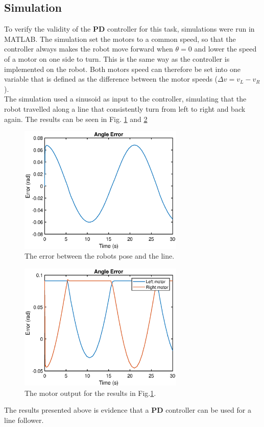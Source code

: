 \subsection{Simulation}

To verify the validity of the \textbf{PD} controller for this task, simulations were run in MATLAB. The simulation set the motors to a common speed, so that the controller always makes the robot move forward when $\theta=0$ and lower the speed of a motor on one side to turn. This is the same way as the controller is implemented on the robot. Both motors speed can therefore be set into one variable that is defined as the difference between the motor speeds ($\Delta v = v_L-v_R$). \\
\indent The simulation used a sinusoid as input to the controller, simulating that the robot travelled along a line that consistently turn from left to right and back again. The results can be seen in Fig. \ref{fig:sim_t_error} and \ref{fig:sim_LR_motor}

\begin{figure}[H]
    \centering
    \includegraphics[width=0.7\textwidth]{img/theta_error.eps}
    \caption{The error between the robots pose and the line.}
    \label{fig:sim_t_error}
\end{figure}

\begin{figure}[H]
    \centering
    \includegraphics[width=0.7\textwidth]{img/LR_motors.eps}
    \caption{The motor output for the results in Fig.\ref{fig:sim_t_error}.}
    \label{fig:sim_LR_motor}
\end{figure}

The results presented above is evidence that a \textbf{PD} controller can be used for a line follower. 

